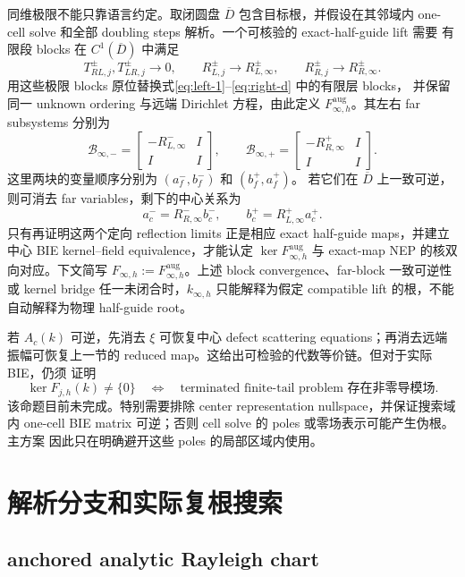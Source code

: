 \documentclass[UTF8,fontset=fandol,11pt,a4paper]{ctexart}
\begin{document}
同维极限不能只靠语言约定。取闭圆盘 $\overline D$ 包含目标根，并假设在其邻域内
one-cell solve 和全部 doubling steps 解析。一个可核验的 exact-half-guide lift 需要
有限段 blocks 在 $C^1(\overline D)$ 中满足
\[
  T_{RL,j}^{\pm},T_{LR,j}^{\pm}\longrightarrow0,
  \qquad
  R_{L,j}^{\pm}\longrightarrow R_{L,\infty}^{\pm},
  \qquad
  R_{R,j}^{\pm}\longrightarrow R_{R,\infty}^{\pm}.
\]
用这些极限 blocks 原位替换式\eqref{eq:left-1}--\eqref{eq:right-d} 中的有限层 blocks，
并保留同一 unknown ordering 与远端 Dirichlet 方程，由此定义
$F_{\infty,h}^{\mathrm{aug}}$。其左右 far subsystems 分别为
\[
  \mathcal B_{\infty,-}
  =\begin{bmatrix}-R_{L,\infty}^-&I\\ I&I\end{bmatrix},
  \qquad
  \mathcal B_{\infty,+}
  =\begin{bmatrix}-R_{R,\infty}^+&I\\ I&I\end{bmatrix}.
\]
这里两块的变量顺序分别为 $(a_f^-,b_f^-)$ 和 $(b_f^+,a_f^+)$。
若它们在 $\overline D$ 上一致可逆，则可消去 far variables，剩下的中心关系为
\[
  a_c^-=R_{R,\infty}^-b_c^-,
  \qquad
  b_c^+=R_{L,\infty}^+a_c^+.
\]
只有再证明这两个定向 reflection limits 正是相应 exact half-guide maps，并建立中心
BIE kernel--field equivalence，才能认定
$\ker F_{\infty,h}^{\mathrm{aug}}$ 与 exact-map NEP 的核双向对应。下文简写
$F_{\infty,h}:=F_{\infty,h}^{\mathrm{aug}}$。上述 block convergence、far-block
一致可逆性或 kernel bridge 任一未闭合时，$k_{\infty,h}$ 只能解释为假定 compatible
lift 的根，不能自动解释为物理 half-guide root。

若 $A_c(k)$ 可逆，先消去 $\xi$ 可恢复中心 defect scattering equations；再消去远端
振幅可恢复上一节的 reduced map。这给出可检验的代数等价链。但对于实际 BIE，仍须
证明
\[
  \ker F_{j,h}(k)\ne\{0\}
  \quad\Longleftrightarrow\quad
  \text{terminated finite-tail problem 存在非零导模场}.
\]
该命题目前未完成。特别需要排除 center representation nullspace，并保证搜索域内
one-cell BIE matrix 可逆；否则 cell solve 的 poles 或零场表示可能产生伪根。主方案
因此只在明确避开这些 poles 的局部区域内使用。

\section{解析分支和实际复根搜索}

\subsection{anchored analytic Rayleigh chart}
\end{document}
